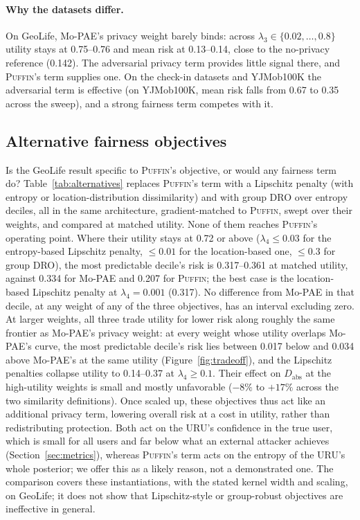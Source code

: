 \documentclass[sigconf,anonymous,review]{acmart}
\newcommand{\puffin}{\textsc{Puffin}}
\begin{document}
\paragraph{Why the datasets differ.} On GeoLife, Mo-PAE's privacy weight barely binds: across $\lambda_3\in\{0.02,\dots,0.8\}$ utility stays at 0.75--0.76 and mean risk at 0.13--0.14, close to the no-privacy reference (0.142). The adversarial privacy term provides little signal there, and \puffin's term supplies one. On the check-in datasets and YJMob100K the adversarial term is effective (on YJMob100K, mean risk falls from 0.67 to 0.35 across the sweep), and a strong fairness term competes with it.

\subsection{Alternative fairness objectives}
\label{sec:results-alternatives}
Is the GeoLife result specific to \puffin's objective, or would any fairness term do? Table~\ref{tab:alternatives} replaces \puffin's term with a Lipschitz penalty (with entropy or location-distribution dissimilarity) and with group DRO over entropy deciles, all in the same architecture, gradient-matched to \puffin{}, swept over their weights, and compared at matched utility. None of them reaches \puffin's operating point. Where their utility stays at 0.72 or above ($\lambda_4\le0.03$ for the entropy-based Lipschitz penalty, $\le0.01$ for the location-based one, $\le0.3$ for group DRO), the most predictable decile's risk is 0.317--0.361 at matched utility, against 0.334 for Mo-PAE and 0.207 for \puffin; the best case is the location-based Lipschitz penalty at $\lambda_4=0.001$ (0.317). No difference from Mo-PAE in that decile, at any weight of any of the three objectives, has an interval excluding zero. At larger weights, all three trade utility for lower risk along roughly the same frontier as Mo-PAE's privacy weight: at every weight whose utility overlaps Mo-PAE's curve, the most predictable decile's risk lies between 0.017 below and 0.034 above Mo-PAE's at the same utility (Figure~\ref{fig:tradeoff}), and the Lipschitz penalties collapse utility to 0.14--0.37 at $\lambda_4\ge0.1$. Their effect on $D_{\mathrm{abs}}$ at the high-utility weights is small and mostly unfavorable ($-8\%$ to $+17\%$ across the two similarity definitions). Once scaled up, these objectives thus act like an additional privacy term, lowering overall risk at a cost in utility, rather than redistributing protection. Both act on the URU's confidence in the true user, which is small for all users and far below what an external attacker achieves (Section~\ref{sec:metrics}), whereas \puffin's term acts on the entropy of the URU's whole posterior; we offer this as a likely reason, not a demonstrated one. The comparison covers these instantiations, with the stated kernel width and scaling, on GeoLife; it does not show that Lipschitz-style or group-robust objectives are ineffective in general.
\end{document}
